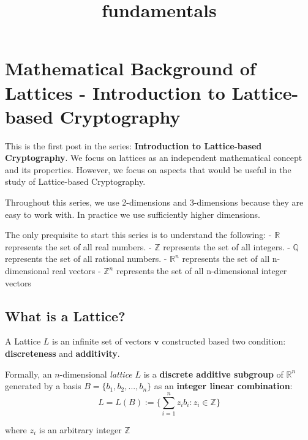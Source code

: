 \documentclass[11pt]{article}
\title{fundamentals}
\begin{document}
    
    \maketitle
    
    

    
    \section{Mathematical Background of Lattices - Introduction to
Lattice-based
Cryptography}\label{mathematical-background-of-lattices---introduction-to-lattice-based-cryptography}

This is the first post in the series: \textbf{Introduction to
Lattice-based Cryptography}. We focus on lattices as an independent
mathematical concept and its properties. However, we focus on aspects
that would be useful in the study of Lattice-based Cryptography.

Throughout this series, we use 2-dimensions and 3-dimensions because
they are easy to work with. In practice we use sufficiently higher
dimensions.

The only prequisite to start this series is to understand the following:
- \(\mathbb{R}\) represents the set of all real numbers. -
\(\mathbb{Z}\) represents the set of all integers. - \(\mathbb{Q}\)
represents the set of all rational numbers. - \(\mathbb{R}^n\)
represents the set of all n-dimensional real vectors - \(\mathbb{Z}^n\)
represents the set of all n-dimensional integer vectors

    \subsection{What is a Lattice?}\label{what-is-a-lattice}

A Lattice \(L\) is an infinite set of vectors \(\mathbf{v}\) constructed
based two condition: \textbf{discreteness} and \textbf{additivity}.

Formally, an \(n\)-dimensional \emph{lattice} \(L\) is a
\textbf{discrete additive subgroup} of \(\mathbb{R}^n\) generated by a
basis \(B = \{b_1, b_2, ..., b_n\}\) as an \textbf{integer linear
combination}:
\[L = L(B):= \{\sum_{i = 1}^{n}z_ib_i: z_i \in \mathbb{Z}\}\]

where \(z_i\) is an arbitrary integer \(\mathbb{Z}\)
\end{document}
